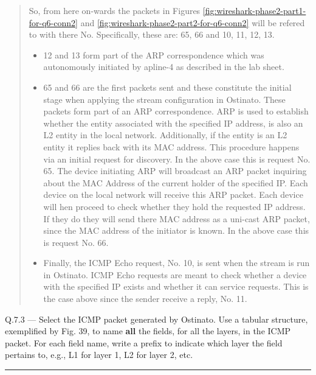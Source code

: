 \documentclass{article}
\newcommand\Que[2]{%
\begin{samepage}
\leavevmode\par
\noindent
Q.#1 --- #2\par\vspace{10pt}\hrule\vspace{10pt}
\end{samepage}}
\newenvironment{ans}
{\fbox{Answer}\begin{quote}\nopagebreak}
{\end{quote}}
\begin{document}
\begin{ans}
So, from here on-wards the packets in Figures
\ref{fig:wireshark-phase2-part1-for-q6-conn2} and
\ref{fig:wireshark-phase2-part2-for-q6-conn2} will be
refered to with there No. Specifically, these are: 65,
66 and 10, 11, 12, 13.

\begin{itemize}
\item 12 and 13 form part of the ARP
      correspondence which was autonomously
      initiated by apline-4 as described in
      the lab sheet.
\item 65 and 66 are the first packets sent and
      these constitute the initial stage when
      applying the stream configuration in
      Ostinato. These packets form part of an
      ARP correspondence. ARP is used to
      establish whether the entity associated
      with the specified IP address, is also
      an L2 entity in the local network.
      Additionally, if the entity is an L2
      entity it replies back with its MAC
      address. This procedure happens via an
      initial request for discovery. In the
      above case this is request No. 65. The
      device initiating ARP will broadcast an
      ARP packet inquiring about the MAC
      Address of the current holder of the
      specified IP. Each device on the local
      network will receive this ARP packet.
      Each device will hen proceed to check
      whether they hold the requested IP
      address. If they do they will send there
      MAC address as a uni-cast ARP packet,
      since the MAC address of the initiator
      is known. In the above case this is
      request No. 66.
\item Finally, the ICMP Echo request, No. 10, is sent when the
      stream is run in Ostinato. ICMP Echo requests are meant to
      check whether a device with the specified IP exists and
      whether it can service requests. This is the case above
      since the sender receive a reply, No. 11.
\end{itemize}
\end{ans}

\newpage

\Que{7.3}{Select the ICMP packet generated by Ostinato. Use a
tabular structure, exemplified by Fig. 39, to name
\textbf{all} the fields, for all the layers, in the ICMP
packet. For each field name, write a prefix to indicate
which layer the field pertains to, e.g., L1 for layer 1,
L2 for layer 2, etc.}
\end{document}
